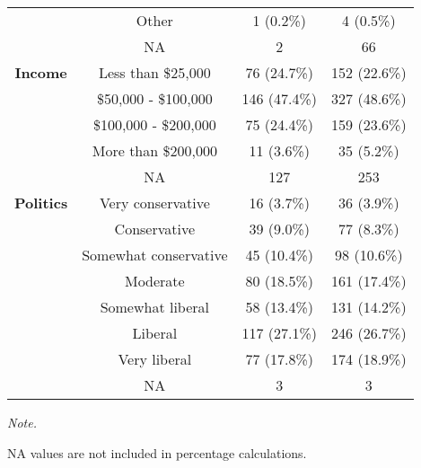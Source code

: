 \begin{table}[!h]
\begin{threeparttable}
\begin{tabular}[t]{>{}cccc}
 & Other & 1 (0.2\%) & 4 (0.5\%)\\

 & NA & 2 & 66\\
\cmidrule{1-4}
\textbf{Income} & Less than \$25,000 & 76 (24.7\%) & 152 (22.6\%)\\

 & \$50,000 - \$100,000 & 146 (47.4\%) & 327 (48.6\%)\\

 & \$100,000 - \$200,000 & 75 (24.4\%) & 159 (23.6\%)\\

 & More than \$200,000 & 11 (3.6\%) & 35 (5.2\%)\\

 & NA & 127 & 253\\
\cmidrule{1-4}
\textbf{Politics} & Very conservative & 16 (3.7\%) & 36 (3.9\%)\\

 & Conservative & 39 (9.0\%) & 77 (8.3\%)\\

 & Somewhat conservative & 45 (10.4\%) & 98 (10.6\%)\\

 & Moderate & 80 (18.5\%) & 161 (17.4\%)\\

 & Somewhat liberal & 58 (13.4\%) & 131 (14.2\%)\\

 & Liberal & 117 (27.1\%) & 246 (26.7\%)\\

 & Very liberal & 77 (17.8\%) & 174 (18.9\%)\\

 & NA & 3 & 3\\
\bottomrule
\end{tabular}
\begin{tablenotes}[para]
\item \textit{Note. } 
\item NA values are not included in percentage calculations.
\end{tablenotes}
\end{threeparttable}
\end{table}
